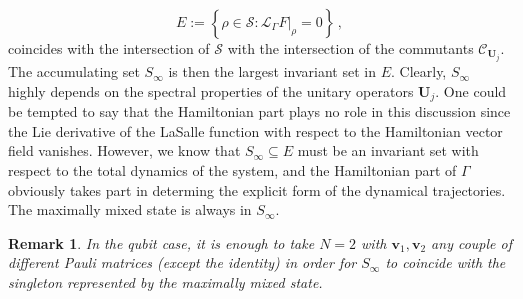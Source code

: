 \documentclass[11pt]{article}
\newcommand{\be}{\begin{equation}}
\newcommand{\ee}{\end{equation}}
\newcommand{\stsp}{\mathcal{S}}
\newtheorem{rem}{Remark}
\begin{document}
\be
E:=\left\{\rho\in\stsp\colon \left.\mathcal{L}_{\Gamma}F\right|_{\rho}=0\right\}\,,
\ee
coincides with the intersection of $\stsp$ with the intersection of the commutants $\mathcal{C}_{\mathbf{U}_{j}}$.
The accumulating set $S_{\infty}$ is then the largest invariant set in $E$.
Clearly, $S_{\infty}$ highly depends on the spectral properties of the unitary operators $\mathbf{U}_{j}$.
One could be tempted to say that the Hamiltonian part plays no role in this discussion since the Lie derivative of the LaSalle function with respect to the Hamiltonian vector field vanishes.
However, we know that $S_{\infty}\subseteq E$ must be an invariant set with respect to the total dynamics of the system, and the Hamiltonian part of $\Gamma$ obviously takes part in determing the explicit form of the dynamical trajectories.
The maximally mixed state is always in $S_{\infty}$.


\begin{rem}
In the qubit case, it is enough to take $N=2$ with $\mathbf{v}_{1},\mathbf{v}_{2}$ any couple of different Pauli matrices (except the identity) in order for $S_{\infty}$ to coincide with the singleton represented by the maximally mixed state.
\end{rem}
\end{document}
